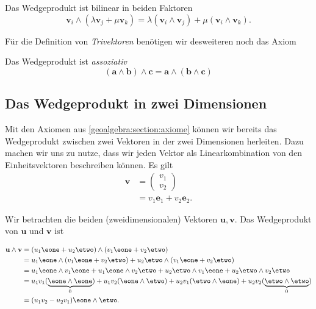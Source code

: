 \begin{axiom}
  Das Wedgeprodukt ist bilinear in beiden Faktoren
  \begin{equation*}
  \mathbf{v}_i \wedge (\lambda \mathbf{v}_j + \mu \mathbf{v}_k) 
  = \lambda (\mathbf{v}_i \wedge \mathbf{v}_j) + \mu (\mathbf{v}_i \wedge \mathbf{v}_k).
  \end{equation*}
\end{axiom}

Für die Definition von \emph{Trivektoren} benötigen wir desweiteren noch das Axiom
\begin{axiom}
  Das Wedgeprodukt ist \em{assoziativ}
  \begin{equation*}
    (\mathbf{a} \wedge \mathbf{b}) \wedge \mathbf{c} = \mathbf{a} \wedge (\mathbf{b} \wedge \mathbf{c})
  \end{equation*}
\end{axiom}

\subsection{Das Wedgeprodukt in zwei Dimensionen}

Mit den Axiomen aus \autoref{geoalgebra:section:axiome} können wir bereits das Wedgeprodukt zwischen zwei
Vektoren in der zwei Dimensionen herleiten.
Dazu machen wir uns zu nutze, dass wir jeden Vektor als
Linearkombination von den Einheitsvektoren beschreiben können.
Es gilt
\begin{align}
  \mathbf{v} &= \begin{pmatrix} v_1 \\ v_2 \end{pmatrix} \\
    &= v_1 \mathbf{e}_1 + v_2 \mathbf{e}_2.
\end{align}

\begin{definition}
  Wir betrachten die beiden (zweidimensionalen) Vektoren $\mathbf{u},
  \mathbf{v}$.
  Das Wedgeprodukt von $\mathbf{u}$ und $\mathbf{v}$ ist

  \begin{equation}
    \begin{aligned}
    \mathbf{u} \wedge \mathbf{v} &= (u_1 \eone + u_2 \etwo) \wedge
    (v_1 \eone + v_2 \etwo) \\
    &= u_1 \eone \wedge (v_1 \eone + v_2 \etwo) + u_2 \etwo \wedge (v_1 \eone + v_2 \etwo) \\
    &= u_1 \eone \wedge v_1 \eone + u_1 \eone \wedge v_2 \etwo + u_2 \etwo \wedge v_1 \eone + u_2 \etwo \wedge v_2 \etwo \\
    &= u_1 v_1 (\underbrace{\eone \wedge \eone}_{0}) + u_1 v_2 (\eone \wedge \etwo) + u_2 v_1 (\etwo \wedge \eone) + u_2 v_2 (\underbrace{\etwo \wedge \etwo}_{0}) \\
    &= (u_1 v_2 - u_2 v_1) \eone \wedge \etwo.
    \end{aligned}
  \end{equation}
\end{definition}

